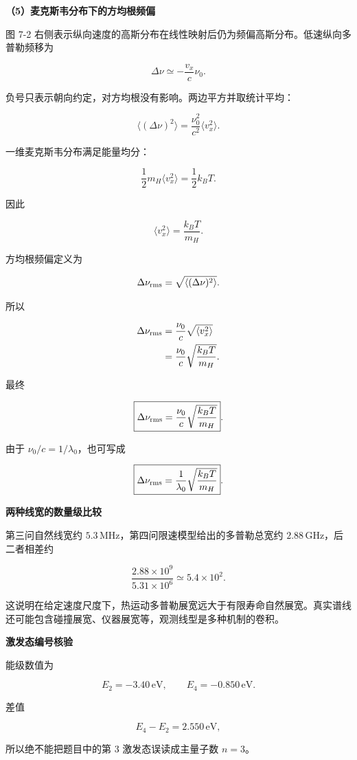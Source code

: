 \documentclass[12pt,a4paper,UTF8]{ctexart}
\begin{document}
\textbf{（5）麦克斯韦分布下的方均根频偏}

图 7-2
右侧表示纵向速度的高斯分布在线性映射后仍为频偏高斯分布。低速纵向多普勒频移为

\[
\Delta\nu\simeq-\frac{v_x}{c}\nu_0.
\]

负号只表示朝向约定，对方均根没有影响。两边平方并取统计平均：

\[
\langle(\Delta\nu)^2\rangle
=\frac{\nu_0^2}{c^2}\langle v_x^2\rangle.
\]

一维麦克斯韦分布满足能量均分：

\[
\frac12m_H\langle v_x^2\rangle=\frac12k_BT.
\]

因此

\[
\langle v_x^2\rangle=\frac{k_BT}{m_H}.
\]

方均根频偏定义为

\[
\Delta\nu_{\rm rms}
=\sqrt{\langle(\Delta\nu)^2\rangle}.
\]

所以

\[
\begin{aligned}
\Delta\nu_{\rm rms}
&=\frac{\nu_0}{c}\sqrt{\langle v_x^2\rangle}\\
&=\frac{\nu_0}{c}\sqrt{\frac{k_BT}{m_H}}.
\end{aligned}
\]

最终

\[
\boxed{
\Delta\nu_{\rm rms}
=\frac{\nu_0}{c}\sqrt{\frac{k_BT}{m_H}}
}.
\]

由于 \(\nu_0/c=1/\lambda_0\)，也可写成

\[
\boxed{
\Delta\nu_{\rm rms}
=\frac1{\lambda_0}\sqrt{\frac{k_BT}{m_H}}
}.
\]

\textbf{两种线宽的数量级比较}

第三问自然线宽约 \(5.3\,\mathrm{MHz}\)，第四问限速模型给出的多普勒总宽约
\(2.88\,\mathrm{GHz}\)，后二者相差约

\[\frac{2.88\times10^9}{5.31\times10^6}\simeq5.4\times10^2.\]

这说明在给定速度尺度下，热运动多普勒展宽远大于有限寿命自然展宽。真实谱线还可能包含碰撞展宽、仪器展宽等，观测线型是多种机制的卷积。

\textbf{激发态编号核验}

能级数值为

\[E_2=-3.40\,\mathrm{eV},\qquad E_4=-0.850\,\mathrm{eV}.\]

差值

\[E_4-E_2=2.550\,\mathrm{eV},\]

所以绝不能把题目中的第 \(3\) 激发态误读成主量子数 \(n=3\)。
\end{document}
